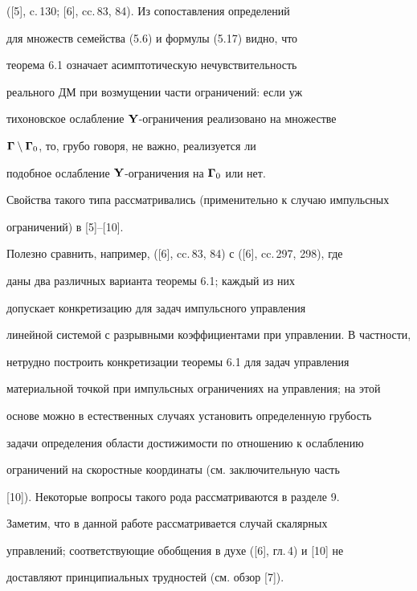 ([5], c.\,130; [6], cc.\,83, 84). Из сопоставления определений


для множеств семейства (5.6) и формулы (5.17) видно, что


теорема 6.1 означает асимптотическую нечувствительность


реального ДМ при возмущении части ограничений: если уж


тихоновское ослабление ${\bold Y}$-ограничения реализовано на множестве


$\boldsymbol \Gamma \setminus {{\boldsymbol \Gamma}_0}$, то, грубо говоря, не важно, реализуется ли


подобное ослабление ${\bold Y}$-ограничения на ${\boldsymbol \Gamma}_0$ или нет.


Свойства такого типа рассматривались (применительно к случаю импульсных


ограничений) в [5]--[10].


Полезно сравнить, например, ([6], cc.\,83, 84) с ([6], cc.\,297, 298), где


даны два различных варианта теоремы 6.1; каждый из них


допускает конкретизацию для задач импульсного управления


линейной системой с разрывными коэффициентами при управлении. В частности,


нетрудно построить конкретизации теоремы 6.1 для задач управления


материальной точкой при импульсных ограничениях на управления; на этой


основе можно в естественных случаях установить определенную грубость


задачи определения области достижимости по отношению к ослаблению


ограничений на скоростные координаты (см. заключительную часть


[10]). Некоторые вопросы такого рода рассматриваются в разделе 9.


Заметим, что в данной работе рассматривается случай скалярных


управлений; соответствующие обобщения в духе ([6], гл.\,4) и [10] не


доставляют принципиальных трудностей (см. обзор [7]).

















